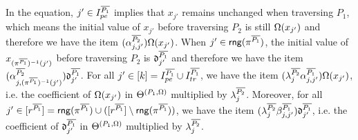 In the equation, $j'\in  I^{\overline{P_1}}_{pe}$ implies that $x_{j'}$ remains unchanged when traversing $P_1$, which means the initial value of $x_{j'}$ before traversing $P_2$ is still $\Omega(x_{j'})$ and therefore we have the item $ (\alpha^{\overline{P_2}}_{j,j'}) \Omega(x_{j'})$. When $j' \in \mathsf{rng}(\pi^{\overline{P_1}})$, the initial value of $x_{(\pi^{\overline{P_1}})^{-1}(j')}$ before traversing $P_2$ is $\mathfrak{d}^{\overline{P_1}}_{j'}$ and therefore we have the item $( \alpha^{\overline{P_2}}_{j,(\pi^{\overline{P_1}})^{-1}(j')}) \mathfrak{d}^{\overline{P_1}}_{j'}$.
For all $j'\in [k] = I^{\overline{P_1}}_{pe} \cup I^{\overline{P_1}}_{tr}$, we have the item $(\lambda^{\overline{P_2}}_{j} \alpha^{\overline{P_1}}_{j,j'}) \Omega(x_{j'})$, i.e. the coefficient of $\Omega(x_{j'})$ in $\Theta^{(P_1, \Omega)}$ multiplied by $\lambda^{\overline{P_2}}_{j}$. Moreover, for all $j'\in [r^{\overline{P_1}}] = \mathsf{rng}(\pi^{\overline{P_1}}) \cup ([r^{\overline{P_1}}] \setminus \mathsf{rng}(\pi^{\overline{P_1}}))$, we have 
the item $( \lambda^{\overline{P_2}}_{j} \beta^{\overline{P_1}}_{j,j'}) \mathfrak{d}^{\overline{P_1}}_{j'}$, i.e. the coefficient of $\mathfrak{d}^{\overline{P_1}}_{j'}$ in $\Theta^{(P_1, \Omega)}$ multiplied by $\lambda^{\overline{P_2}}_{j}$.


